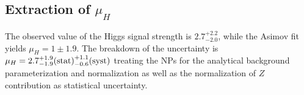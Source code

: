 

\subsection{Extraction of $\mu_{H}$}
\label{sec:vbf-higgsunblind}

The observed value of the Higgs signal strength is $2.7^{+2.2}_{-2.0}$, while the Asimov fit yields $\mu_{H}=1\pm 1.9$. The breakdown of the uncertainty is $\mu_H=2.7^{+1.9}_{-1.9}\textnormal{(stat)}^{+1.1}_{-0.6}\textnormal{(syst)}$ treating the NPs for the analytical background parameterization and normalization as well as the normalization of $Z$ contribution as statistical uncertainty.



